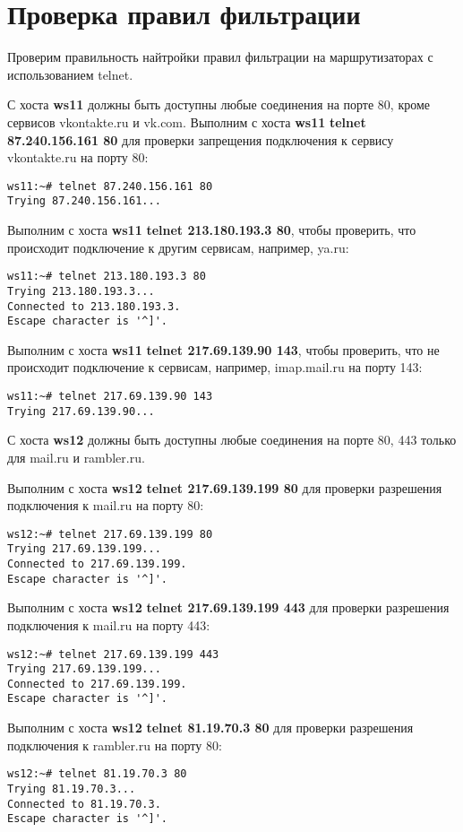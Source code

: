 \documentclass[a4paper,12pt]{article}
\begin{document}
\section{Проверка правил фильтрации}

Проверим правильность найтройки правил фильтрации на маршрутизаторах
с использованием  telnet.

С хоста \textbf{ws11} должны быть доступны любые соединения на порте 80, кроме
сервисов vkontakte.ru и vk.com.
Выполним с хоста \textbf{ws11} \textbf{telnet 87.240.156.161 80} для проверки запрещения подключения
к сервису vkontakte.ru на порту 80:
\begin{Verbatim}
ws11:~# telnet 87.240.156.161 80
Trying 87.240.156.161...
\end{Verbatim}

Выполним с хоста \textbf{ws11} \textbf{telnet 213.180.193.3 80},  чтобы проверить, что
происходит подключение к другим сервисам, например, ya.ru:
\begin{Verbatim}
ws11:~# telnet 213.180.193.3 80
Trying 213.180.193.3...
Connected to 213.180.193.3.
Escape character is '^]'.
\end{Verbatim}

Выполним с хоста \textbf{ws11} \textbf{telnet 217.69.139.90 143},  чтобы проверить,
что не происходит подключение к сервисам, например, imap.mail.ru на порту 143:
\begin{Verbatim}
ws11:~# telnet 217.69.139.90 143
Trying 217.69.139.90...
\end{Verbatim}

С хоста \textbf{ws12} должны быть доступны любые соединения на порте 80, 443
только для mail.ru и rambler.ru. 

Выполним с хоста \textbf{ws12} \textbf{telnet 217.69.139.199 80} для проверки
разрешения подключения к mail.ru на порту 80:
\begin{Verbatim}
ws12:~# telnet 217.69.139.199 80
Trying 217.69.139.199...
Connected to 217.69.139.199.
Escape character is '^]'.
\end{Verbatim}

Выполним с хоста \textbf{ws12} \textbf{telnet 217.69.139.199 443} для проверки
разрешения подключения к mail.ru на порту 443:
\begin{Verbatim}
ws12:~# telnet 217.69.139.199 443
Trying 217.69.139.199...
Connected to 217.69.139.199.
Escape character is '^]'.
\end{Verbatim}

Выполним с хоста \textbf{ws12} \textbf{telnet 81.19.70.3 80} для проверки
разрешения подключения к rambler.ru на порту 80:
\begin{Verbatim}
ws12:~# telnet 81.19.70.3 80
Trying 81.19.70.3...
Connected to 81.19.70.3.
Escape character is '^]'.
\end{Verbatim}
\end{document}
